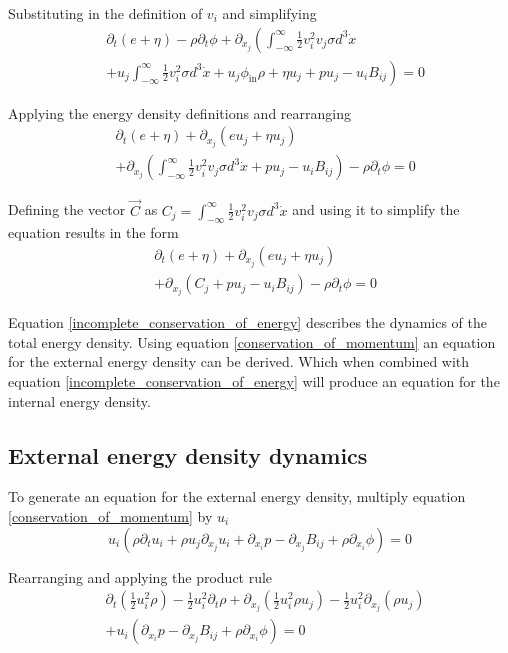 \documentclass[%
 reprint,
 amsmath,amssymb,
 aps,
]{revtex4-1}
\newcommand{\intVdot}[1]{\int_{-\infty}^{\infty} #1 d^3\dot{x}}
\begin{document}
Substituting in the definition of $v_i$ and simplifying
\[
\begin{split}
& \partial_t\left(e + \eta\right)  - \rho\partial_t\phi + \partial_{x_j}\left(\intVdot{\frac{1}{2}v_i^2 v_j\sigma} \right. \\ & \left. + u_j\intVdot{\frac{1}{2}v_i^2\sigma} + u_j\phi_{\text{in}}\rho + \eta u_j + p u_j - u_i B_{ij}\right)=0
\end{split}
\]

Applying the energy density definitions and rearranging
\[
\begin{split}
& \partial_t\left(e + \eta\right) + \partial_{x_j}\left(e u_j + \eta u_j\right) \\ & + \partial_{x_j}\left(\intVdot{\frac{1}{2}v_i^2 v_j\sigma} + p u_j - u_i B_{ij}\right) - \rho\partial_t\phi=0
\end{split}
\]

Defining the vector $\vec{C}$ as $C_j = \intVdot{\frac{1}{2}v_i^2 v_j\sigma}$ and using it to simplify the equation results in the form
\begin{equation}
\begin{split}
& \partial_t\left(e + \eta\right) + \partial_{x_j}\left(e u_j + \eta u_j\right) \\ & + \partial_{x_j}\left(C_j + p u_j - u_i B_{ij}\right) - \rho\partial_t\phi=0
\end{split}
\label{incomplete_conservation_of_energy}
\end{equation}

Equation \eqref{incomplete_conservation_of_energy} describes the dynamics of the total energy density. Using equation \eqref{conservation_of_momentum} an equation for the external energy density can be derived. Which when combined with equation \eqref{incomplete_conservation_of_energy} will produce an equation for the internal energy density.

\subsection{External energy density dynamics}
To generate an equation for the external energy density, multiply equation \eqref{conservation_of_momentum} by $u_i$
\[
u_i\left(\rho\partial_t u_i + \rho u_j\partial_{x_j}u_i + \partial_{x_i}p - \partial_{x_j}B_{ij} + \rho\partial_{x_i}\phi\right)=0
\]

Rearranging and applying the product rule
\[
\begin{split}
& \partial_t\left(\frac{1}{2}u_i^2\rho\right) - \frac{1}{2}u_i^2\partial_t\rho + \partial_{x_j}\left(\frac{1}{2}u_i^2\rho u_j\right) - \frac{1}{2}u_i^2\partial_{x_j}\left(\rho u_j\right) \\ & + u_i\left(\partial_{x_i}p - \partial_{x_j}B_{ij} + \rho\partial_{x_i}\phi\right)=0
\end{split}
\]
\end{document}
